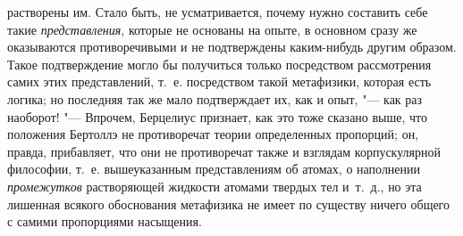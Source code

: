 растворены им. Стало быть, не усматривается, почему нужно составить себе
такие {\em представления}, которые не основаны на
опыте, в основном сразу же оказываются противоречивыми и не подтверждены
каким-нибудь другим образом. Такое подтверждение могло бы получиться только
посредством рассмотрения самих этих представлений, т.~е. посредством такой
метафизики, которая есть логика; но последняя так же мало подтверждает их,
как и опыт, "--- как раз наоборот! "--- Впрочем, Берцелиус признает, как это тоже
сказано выше, что положения Бертоллэ не противоречат теории определенных
пропорций; он, правда, прибавляет, что они не противоречат также и взглядам
корпускулярной философии, т.~е. вышеуказанным представлениям об атомах, о
наполнении {\em промежутков} растворяющей жидкости
атомами твердых тел и~т.~д., но эта лишенная всякого обоснования метафизика
не имеет по существу ничего общего с самими пропорциями насыщения.

